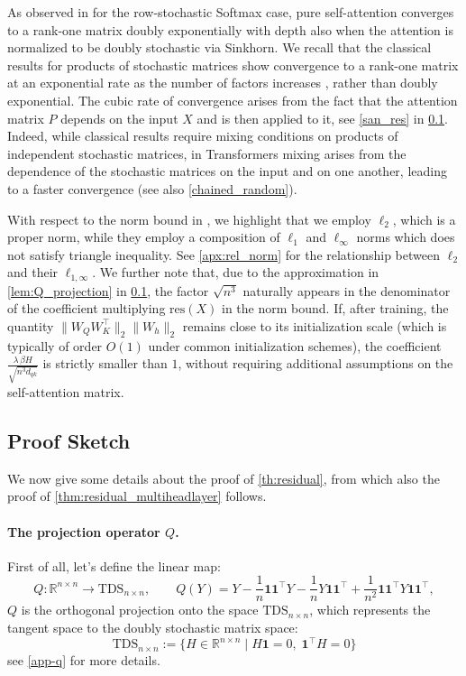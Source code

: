 \documentclass{article}
\newcommand{\R}{\mathbb{R}}
\theoremstyle{definition}
\theoremstyle{plain}
\newcommand{\TDS}{\mathrm{TDS}_{n \times n}}
\newcommand{\lra}{\longrightarrow}
\begin{document}
As observed in \cite{dong2021attention} for the row-stochastic Softmax case, pure self-attention converges to a rank-one matrix doubly exponentially with depth also when the attention is normalized to be doubly stochastic via Sinkhorn. We recall that the classical results for products of stochastic matrices show convergence to a rank-one matrix at an exponential rate as the number of factors increases \cite{Anthonisse1977ExponentialCO}, rather than doubly exponential. The cubic rate of convergence arises from the fact that the attention matrix $P$ depends on the input $X$ and is then applied to it, see \cref{san_res} in \cref{proof_sketch}. Indeed, while classical results require mixing conditions on products of independent stochastic matrices, in Transformers mixing arises from the dependence of the stochastic matrices on the input and on one another, leading to a faster convergence (see also \cref{chained_random}).

With respect to the norm bound in \cite{dong2021attention}, we highlight that we employ $\ell_2$, which is a proper norm, while they employ a composition of  $\ell_1$ and  $\ell_{\infty}$ norms which does not satisfy triangle inequality. See \cref{apx:rel_norm} for the relationship between  $\ell_2$ and their $\ell_{1,\infty}$. We further note that, due to the approximation in \cref{lem:Q_projection} in \cref{proof_sketch}, the factor $\sqrt{n^{3}}$ naturally appears in the denominator of the coefficient multiplying $\mathrm{res}(X)$ in the norm bound. If, after training, the quantity $\|W_Q W_K^\top\|_2\|W_h\|_2$ remains close to its initialization scale (which is typically of order $O(1)$ under common initialization schemes), the coefficient $\frac{\lambda\, \beta H}{\sqrt{n^{3}d_{qk}}}$ is strictly smaller than $1$, without requiring additional assumptions on the self-attention matrix.

\subsection{Proof Sketch}\label{proof_sketch}

We now give some details about the proof of \cref{th:residual}, from which also the proof of \cref{thm:residual_multiheadlayer} follows. 

\paragraph{The projection operator $Q$.} First of all, let's define the linear map:
$$
Q: \R^{n\times n} \lra \TDS, \qquad Q(Y)
= Y
- \frac{1}{n} \mathbf{1}\mathbf{1}^\top Y
- \frac{1}{n} Y \mathbf{1}\mathbf{1}^\top
+ \frac{1}{n^2} \mathbf{1}\mathbf{1}^\top Y \mathbf{1}\mathbf{1}^\top,
$$
$Q$ is the orthogonal projection onto the space $\TDS${, which represents} the tangent space to the doubly stochastic matrix space:
$$
 \TDS:= \{ H \in \mathbb{R}^{n\times n} \mid
H\mathbf{1} = 0,\;
\mathbf{1}^\top H = 0 \}
$$
see \cref{app-q} for more details.
\end{document}
